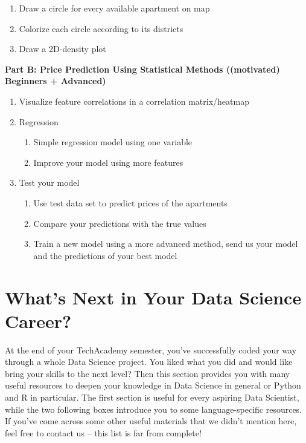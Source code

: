 \documentclass[
  11pt,
]{book}
\begin{document}
\begin{enumerate}
  \begin{enumerate}
  \def\labelenumii{\alph{enumii}.}
  \item
    Draw a circle for every available apartment on map
  \item
    Colorize each circle according to its districts
  \item
    Draw a 2D-density plot
  \end{enumerate}
\end{enumerate}

\textbf{Part B: Price Prediction Using Statistical Methods ((motivated) Beginners + Advanced)}

\begin{enumerate}
\def\labelenumi{\arabic{enumi}.}
\item
  Visualize feature correlations in a correlation matrix/heatmap
\item
  Regression

  \begin{enumerate}
  \def\labelenumii{\alph{enumii}.}
  \item
    Simple regression model using one variable
  \item
    Improve your model using more features
  \end{enumerate}
\item
  Test your model

  \begin{enumerate}
  \def\labelenumii{\alph{enumii}.}
  \item
    Use test data set to predict prices of the apartments
  \item
    Compare your predictions with the true values
  \item
    Train a new model using a more advanced method, send us your model and the predictions of your best model
  \end{enumerate}
\end{enumerate}

\newpage

\hypertarget{whats-next-in-your-data-science-career}{%
\chapter{What's Next in Your Data Science Career?}\label{whats-next-in-your-data-science-career}}

At the end of your TechAcademy semester, you've successfully coded your way through a whole Data Science project. You liked what you did and would like bring your skills to the next level? Then this section provides you with many useful resources to deepen your knowledge in Data Science in general or Python and R in particular. The first section is useful for every aspiring Data Scientist, while the two following boxes introduce you to some language-specific resources. If you've come across some other useful materials that we didn't mention here, feel free to contact us -- this list is far from complete!
\end{document}
